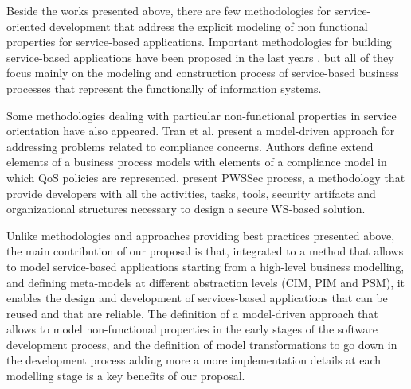 Beside the works presented above, there are few methodologies for service-oriented development that address the explicit modeling of non functional properties for service-based applications. Important methodologies for building service-based applications have been proposed in the last years \cite{Ramollari_asurvey,PapazoglouH06,FeuerlichtM05,soma,Arsanjani:2008}, but all of they focus mainly on the modeling and construction process of service-based business processes that represent the functionally of information systems.

Some methodologies dealing with particular non-functional properties in service orientation have also appeared. Tran et al. \cite{Tran2012531} present a model-driven approach for addressing problems related to compliance concerns. Authors define extend elements of a business process models with elements of a compliance model in which QoS policies are represented.\cite{GutierrezRF10} present PWSSec process, a methodology that provide developers with all the activities, tasks, tools, security artifacts and organizational structures necessary to design a secure WS-based solution.

Unlike methodologies and approaches providing best practices presented above, the main contribution of our proposal is that, integrated to a method that allows to model service-based applications starting from a high-level business modelling, and defining meta-models at different abstraction levels (CIM, PIM and PSM), it enables the design and development of services-based applications that can be reused and that are reliable. The definition of a model-driven approach that allows to model non-functional properties in the early stages of the software development process, and the definition of model transformations to go down in the development process adding more a more implementation details at each modelling stage is a key benefits of our proposal.


